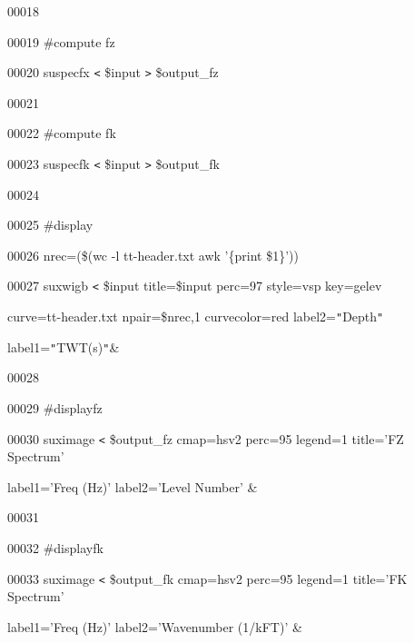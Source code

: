\documentclass{article}
\begin{document}
\vspace{4pt}
00018 

\vspace{4pt}
00019 \#compute fz

\vspace{4pt}
00020 suspecfx \texttt{<} \$input \texttt{>} \$output\_fz

\vspace{4pt}
00021 

\vspace{4pt}
00022 \#compute fk

\vspace{4pt}
00023 suspecfk \texttt{<} \$input \texttt{>} \$output\_fk

\vspace{4pt}
00024 

\vspace{4pt}
00025 \#display

\vspace{4pt}
00026 nrec=(\$(wc -l tt-header.txt \textbar{} awk '\{print \$1\}'))

\vspace{4pt}
00027 suxwigb \texttt{<} \$input title=\$input perc=97 style=vsp key=gelev 

\vspace{4pt}
\parindent=18pt
curve=tt-header.txt npair=\$nrec,1 curvecolor=red label2=\texttt{"}Depth\texttt{"} 

\vspace{4pt}
label1=\texttt{"}TWT(s)\texttt{"}\&

\vspace{4pt}
\parindent=0pt
00028 

\vspace{4pt}
00029 \#displayfz

\vspace{4pt}
00030 suximage \texttt{<} \$output\_fz cmap=hsv2 perc=95 legend=1 title='FZ Spectrum' 

\vspace{4pt}
\parindent=18pt
label1='Freq (Hz)' label2='Level Number' \&

\vspace{4pt}
\parindent=0pt
00031 

\vspace{4pt}
00032 \#displayfk

\vspace{4pt}
00033 suximage \texttt{<} \$output\_fk cmap=hsv2 perc=95 legend=1 title='FK Spectrum' 

\vspace{4pt}
\parindent=18pt
label1='Freq (Hz)' label2='Wavenumber (1/kFT)' \& 
\end{document}
